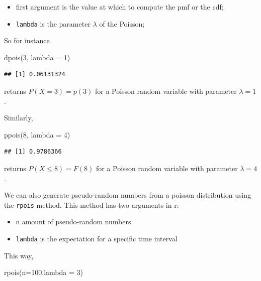 \documentclass[
]{book}
\newenvironment{Shaded}{\begin{snugshade}}{\end{snugshade}}
\newcommand{\AttributeTok}[1]{\textcolor[rgb]{0.77,0.63,0.00}{#1}}
\newcommand{\DecValTok}[1]{\textcolor[rgb]{0.00,0.00,0.81}{#1}}
\newcommand{\FunctionTok}[1]{\textcolor[rgb]{0.00,0.00,0.00}{#1}}
\newcommand{\NormalTok}[1]{#1}
\providecommand{\tightlist}{%
  \setlength{\itemsep}{0pt}\setlength{\parskip}{0pt}}
\theoremstyle{definition}
\theoremstyle{definition}
\theoremstyle{definition}
\theoremstyle{definition}
\theoremstyle{remark}
\begin{document}
\begin{itemize}
\item
  first argument is the value at which to compute the pmf or the cdf;
\item
  \texttt{lambda} is the parameter \(\lambda\) of the Poisson;
\end{itemize}

So for instance

\begin{Shaded}
\begin{Highlighting}[]
\FunctionTok{dpois}\NormalTok{(}\DecValTok{3}\NormalTok{, }\AttributeTok{lambda =} \DecValTok{1}\NormalTok{)}
\end{Highlighting}
\end{Shaded}

\begin{verbatim}
## [1] 0.06131324
\end{verbatim}

returns \(P(X=3)=p(3)\) for a Poisson random variable with parameter \(\lambda = 1\).

Similarly,

\begin{Shaded}
\begin{Highlighting}[]
\FunctionTok{ppois}\NormalTok{(}\DecValTok{8}\NormalTok{, }\AttributeTok{lambda =} \DecValTok{4}\NormalTok{)}
\end{Highlighting}
\end{Shaded}

\begin{verbatim}
## [1] 0.9786366
\end{verbatim}

returns \(P(X\leq 8) = F(8)\) for a Poisson random variable with parameter \(\lambda = 4\).

We can also generate pseudo-random numbers from a poisson distribution using the \texttt{rpois} method. This method has two arguments in r:

\begin{itemize}
\tightlist
\item
  \texttt{n} amount of pseudo-random numbers
\item
  \texttt{lambda} is the expectation for a specific time interval
\end{itemize}

This way,

\begin{Shaded}
\begin{Highlighting}[]
\FunctionTok{rpois}\NormalTok{(}\AttributeTok{n=}\DecValTok{100}\NormalTok{,}\AttributeTok{lambda =} \DecValTok{3}\NormalTok{)}
\end{Highlighting}
\end{Shaded}
\end{document}
